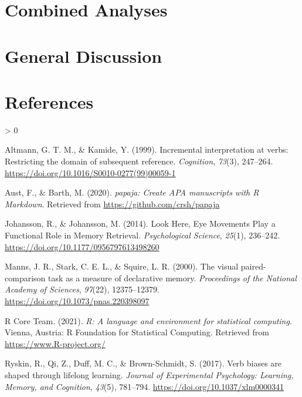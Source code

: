 \documentclass[
  english,
  man]{apa6}
\newlength{\cslhangindent}
\newenvironment{CSLReferences}[2] %
 {%
  \setlength{\parindent}{0pt}
  \ifodd #1 \everypar{\setlength{\hangindent}{\cslhangindent}}\ignorespaces\fi
  \ifnum #2 > 0
  \setlength{\parskip}{#2\baselineskip}
  \fi
 }%
 {}
\begin{document}
\hypertarget{combined-analyses}{%
\section{Combined Analyses}\label{combined-analyses}}

\hypertarget{general-discussion}{%
\section{General Discussion}\label{general-discussion}}

\newpage

\hypertarget{references}{%
\section{References}\label{references}}

\begingroup
\setlength{\parindent}{-0.5in}
\setlength{\leftskip}{0.5in}

\hypertarget{refs}{}
\begin{CSLReferences}{1}{0}
\leavevmode\hypertarget{ref-altmannIncrementalInterpretationVerbs1999}{}%
Altmann, G. T. M., \& Kamide, Y. (1999). Incremental interpretation at verbs: Restricting the domain of subsequent reference. \emph{Cognition}, \emph{73}(3), 247--264. \url{https://doi.org/10.1016/S0010-0277(99)00059-1}

\leavevmode\hypertarget{ref-R-papaja}{}%
Aust, F., \& Barth, M. (2020). \emph{{papaja}: {Create} {APA} manuscripts with {R Markdown}}. Retrieved from \url{https://github.com/crsh/papaja}

\leavevmode\hypertarget{ref-johanssonLookHereEye2014}{}%
Johansson, R., \& Johansson, M. (2014). Look {Here}, {Eye Movements Play} a {Functional Role} in {Memory Retrieval}. \emph{Psychological Science}, \emph{25}(1), 236--242. \url{https://doi.org/10.1177/0956797613498260}

\leavevmode\hypertarget{ref-mannsVisualPairedcomparisonTask2000}{}%
Manns, J. R., Stark, C. E. L., \& Squire, L. R. (2000). The visual paired-comparison task as a measure of declarative memory. \emph{Proceedings of the National Academy of Sciences}, \emph{97}(22), 12375--12379. \url{https://doi.org/10.1073/pnas.220398097}

\leavevmode\hypertarget{ref-R-base}{}%
R Core Team. (2021). \emph{R: A language and environment for statistical computing}. Vienna, Austria: R Foundation for Statistical Computing. Retrieved from \url{https://www.R-project.org/}

\leavevmode\hypertarget{ref-ryskinVerbBiasesAre2017}{}%
Ryskin, R., Qi, Z., Duff, M. C., \& Brown-Schmidt, S. (2017). Verb biases are shaped through lifelong learning. \emph{Journal of Experimental Psychology: Learning, Memory, and Cognition}, \emph{43}(5), 781--794. \url{https://doi.org/10.1037/xlm0000341}

\end{CSLReferences}

\endgroup
\end{document}
